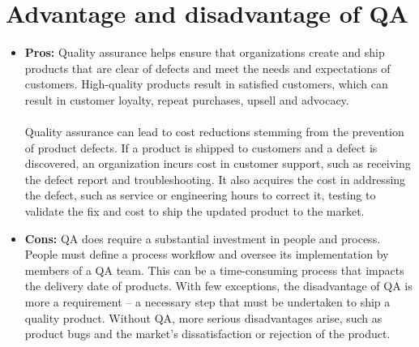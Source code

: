 \documentclass{article}
\begin{document}
\section{Advantage and disadvantage of QA}
\begin{itemize}
\item \textbf{Pros: } Quality assurance helps ensure that organizations create and ship products that are clear of defects and meet the needs and expectations of customers. High-quality products result in satisfied customers, which can result in customer loyalty, repeat purchases, upsell and advocacy.\\~\\
Quality assurance can lead to cost reductions stemming from the prevention of product defects. If a product is shipped to customers and a defect is discovered, an organization incurs cost in customer support, such as receiving the defect report and troubleshooting. It also acquires the cost in addressing the defect, such as service or engineering hours to correct it, testing to validate the fix and cost to ship the updated product to the market.
\item \textbf{Cons: } QA does require a substantial investment in people and process. People must define a process workflow and oversee its implementation by members of a QA team. This can be a time-consuming process that impacts the delivery date of products. With few exceptions, the disadvantage of QA is more a requirement -- a necessary step that must be undertaken to ship a quality product. Without QA, more serious disadvantages arise, such as product bugs and the market’s dissatisfaction or rejection of the product.
\end{itemize}
\newpage
\end{document}
